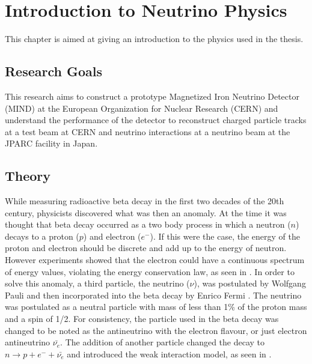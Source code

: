\chapter{Introduction to Neutrino Physics}
\label{c:theoryIntro}

This chapter is aimed at giving an introduction to the physics used in the thesis.

\section{Research Goals}
This research aims to construct a prototype Magnetized Iron Neutrino Detector (MIND) at the European Organization for Nuclear Research (CERN) and understand the performance of the detector to reconstruct charged particle tracks at a test beam at CERN and neutrino interactions at a neutrino beam at the JPARC facility in Japan.

\section{Theory}\label{section:Theory}
While measuring radioactive beta decay in the first two decades of the 20th century, physicists discovered what was then an anomaly. At the time it was thought that beta decay occurred as a two body process in which a neutron ($n$) decays to a proton ($p$) and electron ($e^-$). If this were the case, the energy of the proton and electron should be discrete and add up to the energy of neutron. However experiments showed that the electron could have a continuous spectrum of energy values, violating the energy conservation law, as seen in . In order to solve this anomaly, a third particle, the neutrino ($\nu$), was postulated by Wolfgang Pauli \cite{4Pauli:Online} and then incorporated into the beta decay by Enrico Fermi \cite{5Wilson}. The neutrino was postulated as a neutral particle with mass of less than 1\% of the proton mass and a spin of 1/2. For consistency, the particle used in the beta decay was changed to be noted as the antineutrino with the electron flavour, or just electron antineutrino $\bar{\nu_e}$. The addition of another particle changed the decay to $n \rightarrow p + e^- + \bar{\nu_e}$ and introduced the weak interaction model, as seen in . 

